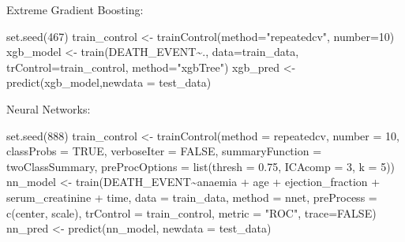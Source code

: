 \documentclass[
]{article}
\newenvironment{Shaded}{\begin{snugshade}}{\end{snugshade}}
\newcommand{\AttributeTok}[1]{\textcolor[rgb]{0.77,0.63,0.00}{#1}}
\newcommand{\ConstantTok}[1]{\textcolor[rgb]{0.00,0.00,0.00}{#1}}
\newcommand{\DecValTok}[1]{\textcolor[rgb]{0.00,0.00,0.81}{#1}}
\newcommand{\FloatTok}[1]{\textcolor[rgb]{0.00,0.00,0.81}{#1}}
\newcommand{\FunctionTok}[1]{\textcolor[rgb]{0.00,0.00,0.00}{#1}}
\newcommand{\NormalTok}[1]{#1}
\newcommand{\OtherTok}[1]{\textcolor[rgb]{0.56,0.35,0.01}{#1}}
\newcommand{\SpecialCharTok}[1]{\textcolor[rgb]{0.00,0.00,0.00}{#1}}
\newcommand{\StringTok}[1]{\textcolor[rgb]{0.31,0.60,0.02}{#1}}
\begin{document}
Extreme Gradient Boosting:

\begin{Shaded}
\begin{Highlighting}[]
\FunctionTok{set.seed}\NormalTok{(}\DecValTok{467}\NormalTok{)}
\NormalTok{train\_control }\OtherTok{\textless{}{-}} \FunctionTok{trainControl}\NormalTok{(}\AttributeTok{method=}\StringTok{"repeatedcv"}\NormalTok{, }\AttributeTok{number=}\DecValTok{10}\NormalTok{)}
\NormalTok{xgb\_model }\OtherTok{\textless{}{-}} \FunctionTok{train}\NormalTok{(DEATH\_EVENT}\SpecialCharTok{\textasciitilde{}}\NormalTok{., }\AttributeTok{data=}\NormalTok{train\_data, }\AttributeTok{trControl=}\NormalTok{train\_control, }\AttributeTok{method=}\StringTok{"xgbTree"}\NormalTok{)}
\NormalTok{xgb\_pred }\OtherTok{\textless{}{-}} \FunctionTok{predict}\NormalTok{(xgb\_model,}\AttributeTok{newdata =}\NormalTok{ test\_data)}
\end{Highlighting}
\end{Shaded}

Neural Networks:

\begin{Shaded}
\begin{Highlighting}[]
\FunctionTok{set.seed}\NormalTok{(}\DecValTok{888}\NormalTok{)}
\NormalTok{train\_control }\OtherTok{\textless{}{-}} \FunctionTok{trainControl}\NormalTok{(}\AttributeTok{method =} \StringTok{\textquotesingle{}repeatedcv\textquotesingle{}}\NormalTok{, }\AttributeTok{number =} \DecValTok{10}\NormalTok{, }\AttributeTok{classProbs =} \ConstantTok{TRUE}\NormalTok{, }\AttributeTok{verboseIter =} \ConstantTok{FALSE}\NormalTok{, }\AttributeTok{summaryFunction =}\NormalTok{ twoClassSummary, }\AttributeTok{preProcOptions =} \FunctionTok{list}\NormalTok{(}\AttributeTok{thresh =} \FloatTok{0.75}\NormalTok{, }\AttributeTok{ICAcomp =} \DecValTok{3}\NormalTok{, }\AttributeTok{k =} \DecValTok{5}\NormalTok{))}
\NormalTok{nn\_model }\OtherTok{\textless{}{-}} \FunctionTok{train}\NormalTok{(DEATH\_EVENT}\SpecialCharTok{\textasciitilde{}}\NormalTok{anaemia }\SpecialCharTok{+}\NormalTok{ age }\SpecialCharTok{+}\NormalTok{ ejection\_fraction }\SpecialCharTok{+}\NormalTok{ serum\_creatinine }\SpecialCharTok{+}\NormalTok{ time, }\AttributeTok{data =}\NormalTok{ train\_data, }\AttributeTok{method =} \StringTok{\textquotesingle{}nnet\textquotesingle{}}\NormalTok{, }\AttributeTok{preProcess =} \FunctionTok{c}\NormalTok{(}\StringTok{\textquotesingle{}center\textquotesingle{}}\NormalTok{, }\StringTok{\textquotesingle{}scale\textquotesingle{}}\NormalTok{), }\AttributeTok{trControl =}\NormalTok{ train\_control, }\AttributeTok{metric =} \StringTok{"ROC"}\NormalTok{, }\AttributeTok{trace=}\ConstantTok{FALSE}\NormalTok{)}
\NormalTok{nn\_pred }\OtherTok{\textless{}{-}} \FunctionTok{predict}\NormalTok{(nn\_model, }\AttributeTok{newdata =}\NormalTok{ test\_data)}
\end{Highlighting}
\end{Shaded}
\end{document}
